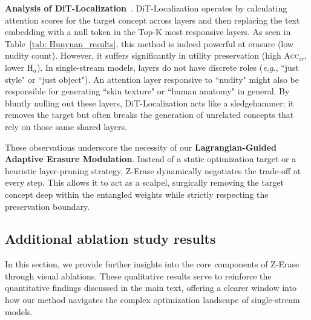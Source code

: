 \textbf{Analysis of DiT-Localization}~\cite{localizing-knowledge-diffusion-transformers}.
DiT-Localization operates by calculating attention scores for the target concept across layers and then replacing the text embedding with a null token in the Top-K most responsive layers. As seen in Table~\ref{tab: Hunyuan_results}, this method is indeed powerful at erasure (low nudity count). However, it suffers significantly in utility preservation (high \textsc{Acc$_{ir}$}, lower \textsc{H$_a$}). In single-stream models, layers do not have discrete roles (\textit{e.g.}, ``just style" or ``just object"). An attention layer responsive to ``nudity" might also be responsible for generating ``skin texture" or ``human anatomy" in general. By bluntly nulling out these layers, DiT-Localization acts like a sledgehammer: it removes the target but often breaks the generation of unrelated concepts that rely on those same shared layers.

These observations underscore the necessity of our \textbf{Lagrangian-Guided Adaptive Erasure Modulation}. Instead of a static optimization target or a heuristic layer-pruning strategy, Z-Erase dynamically negotiates the trade-off at every step. This allows it to act as a scalpel, surgically removing the target concept deep within the entangled weights while strictly respecting the preservation boundary.

\subsection{Additional ablation study results}

In this section, we provide further insights into the core components of Z-Erase through visual ablations. These qualitative results serve to reinforce the quantitative findings discussed in the main text, offering a clearer window into how our method navigates the complex optimization landscape of single-stream models.

